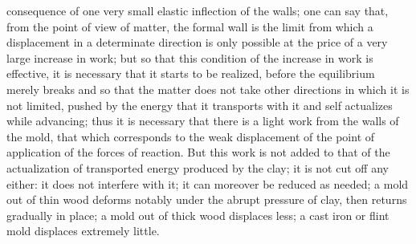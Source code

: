 \documentclass[a4paper]{article}
\begin{document}
consequence of one very small elastic inflection of the walls; one can say that, from the point of view of matter, the formal wall is the limit from which a displacement in a determinate direction is only possible at the price of a very large increase in work; but so that this condition of the increase in work is effective, it is necessary that it starts to be realized, before the equilibrium merely breaks and so that the matter does not take other directions in which it is not limited, pushed by the energy that it transports with it and self actualizes while advancing; thus it is necessary that there is a light work from the walls of the mold, that which corresponds to the weak displacement of the point of application of the forces of reaction. But this work is not added to that of the actualization of transported energy produced by the clay; it is not cut off any either: it does not interfere with it; it can moreover be reduced as needed; a mold out of thin wood deforms notably under the abrupt pressure of clay, then returns gradually in place; a mold out of thick wood displaces less; a cast iron or flint mold displaces extremely little.
\end{document}
